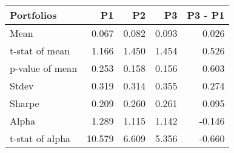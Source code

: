 \begin{tabular}{lrrrr}
\toprule
Portfolios & P1 & P2 & P3 & P3 - P1 \\
\midrule
Mean & 0.067 & 0.082 & 0.093 & 0.026 \\
t-stat of mean & 1.166 & 1.450 & 1.454 & 0.526 \\
p-value of mean & 0.253 & 0.158 & 0.156 & 0.603 \\
Stdev & 0.319 & 0.314 & 0.355 & 0.274 \\
Sharpe & 0.209 & 0.260 & 0.261 & 0.095 \\
Alpha & 1.289 & 1.115 & 1.142 & -0.146 \\
t-stat of alpha & 10.579 & 6.609 & 5.356 & -0.660 \\
\bottomrule
\end{tabular}
